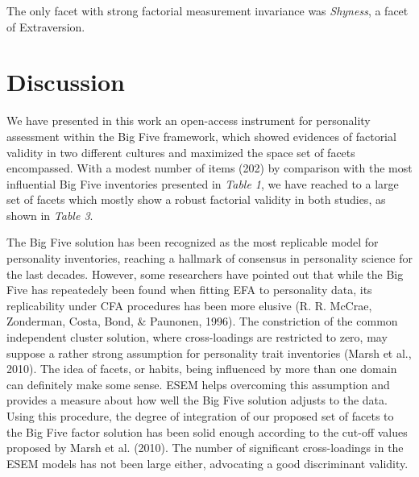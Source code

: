 \documentclass[,man,floatsintext]{apa6}
\begin{document}
The only facet with strong factorial measurement invariance was
\emph{Shyness}, a facet of Extraversion.

\vspace{5mm}

\vspace{5mm}

\section{Discussion}\label{discussion}

We have presented in this work an open-access instrument for personality
assessment within the Big Five framework, which showed evidences of
factorial validity in two different cultures and maximized the space set
of facets encompassed. With a modest number of items (202) by comparison
with the most influential Big Five inventories presented in \emph{Table
1}, we have reached to a large set of facets which mostly show a robust
factorial validity in both studies, as shown in \emph{Table 3}.

The Big Five solution has been recognized as the most replicable model
for personality inventories, reaching a hallmark of consensus in
personality science for the last decades. However, some researchers have
pointed out that while the Big Five has repeatedely been found when
fitting EFA to personality data, its replicability under CFA procedures
has been more elusive (R. R. McCrae, Zonderman, Costa, Bond, \&
Paunonen, 1996). The constriction of the common independent cluster
solution, where cross-loadings are restricted to zero, may suppose a
rather strong assumption for personality trait inventories (Marsh et
al., 2010). The idea of facets, or habits, being influenced by more than
one domain can definitely make some sense. ESEM helps overcoming this
assumption and provides a measure about how well the Big Five solution
adjusts to the data. Using this procedure, the degree of integration of
our proposed set of facets to the Big Five factor solution has been
solid enough according to the cut-off values proposed by Marsh et al.
(2010). The number of significant cross-loadings in the ESEM models has
not been large either, advocating a good discriminant validity.
\end{document}
